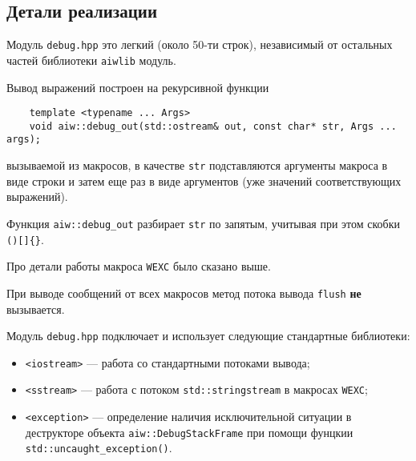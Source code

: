 \subsection{Детали реализации}
Модуль \verb'debug.hpp' это легкий (около 50-ти строк), независимый от остальных частей библиотеки \verb'aiwlib' модуль.

Вывод выражений построен на рекурсивной функции
\begin{verbatim}
    template <typename ... Args> 
    void aiw::debug_out(std::ostream& out, const char* str, Args ... args);
\end{verbatim}
вызываемой из макросов, в качестве \verb'str' подставляются аргументы макроса в виде строки и затем еще раз
в виде аргументов (уже значений соответствующих выражений). 

Функция \verb'aiw::debug_out' разбирает \verb'str' по запятым, учитывая при этом скобки \verb'()[]{}'.

Про детали работы макроса \verb'WEXC' было сказано выше.

При выводе сообщений от всех макросов метод потока вывода \verb'flush' {\bf не} вызывается. 

Модуль \verb'debug.hpp' подключает и использует следующие стандартные библиотеки:
\begin{itemize}
  \item \verb'<iostream>' --- работа со стандартными потоками вывода;
  \item \verb'<sstream>' --- работа с потоком \verb'std::stringstream' в макросах \verb'WEXC';
  \item \verb'<exception>' --- определение наличия исключительной ситуации в деструкторе объекта \verb'aiw::DebugStackFrame'
    при помощи фунцкии \verb'std::uncaught_exception()'.
\end{itemize}


 

